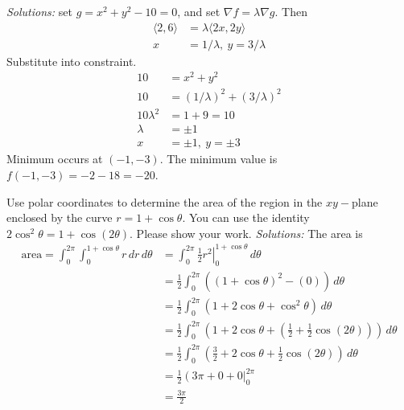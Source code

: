\ifnum {} 
    {\color{DarkBlue} \textit{Solutions:} set $g = x^2+y^2-10 =0$, and set $\nabla f = \lambda \nabla g$. Then
    \begin{align*}
        \langle 2,6\rangle &= \lambda \langle 2x,2y\rangle \\
        x&= 1/\lambda, \ y = 3/\lambda 
    \end{align*}
    Substitute into constraint.
    \begin{align*}          
        10 &=x^2+y^2 \\
        10 &= (1/\lambda)^2 + (3/\lambda)^2 \\
        10\lambda^2 &= 1 + 9 = 10 \\ 
        \lambda &= \pm 1 \\
        x&= \pm 1, \ y = \pm 3
    \end{align*}
    Minimum occurs at $(-1,-3)$. The minimum value is $f(-1,-3) = -2-18 = -20$. 
    } 
\else
  
\fi
\fi

\ifnum {}

    \question[4] Use polar coordinates to determine the area of the region in the $xy-$plane enclosed by the curve $r = 1 + \cos\theta$. You can use the identity $2\cos^2\theta = 1+\cos(2\theta)$. Please show your work. 
    \ifnum {} 
    {\color{DarkBlue} \textit{Solutions:}
    The area is
    \begin{align}
        \text{area}=\int_{0}^{2\pi}\int_{0}^{1+\cos\theta}  r  \, dr \, d\theta 
        &= \int_{0}^{2\pi }\left. \frac12r^2 \right|_0^{1+\cos\theta}   \, d\theta \\
        &= \frac12 \int_{0}^{2\pi} \left( (1+\cos\theta)^2 - (0) \right)   \, d\theta \\
        &= \frac12\int_{0}^{2\pi } \left( 1+2\cos\theta + \cos^2\theta  \right)   \, d\theta \\
        &= \frac12\int_{0}^{2\pi } \left( 1+2\cos\theta + (\frac12 + \frac12\cos(2\theta))  \right)   \, d\theta \\
        &= \frac12 \int_{0}^{2\pi }  \left( \frac32+2\cos\theta  + \frac12 \cos(2\theta)  \right)   \, d\theta \\
        &= \frac12 \left( 3\pi +0 +0  \right|_{0}^{2\pi } \\
        &= \frac{3\pi}{2}
    \end{align}
    }
    \else

    \fi
    
\fi




